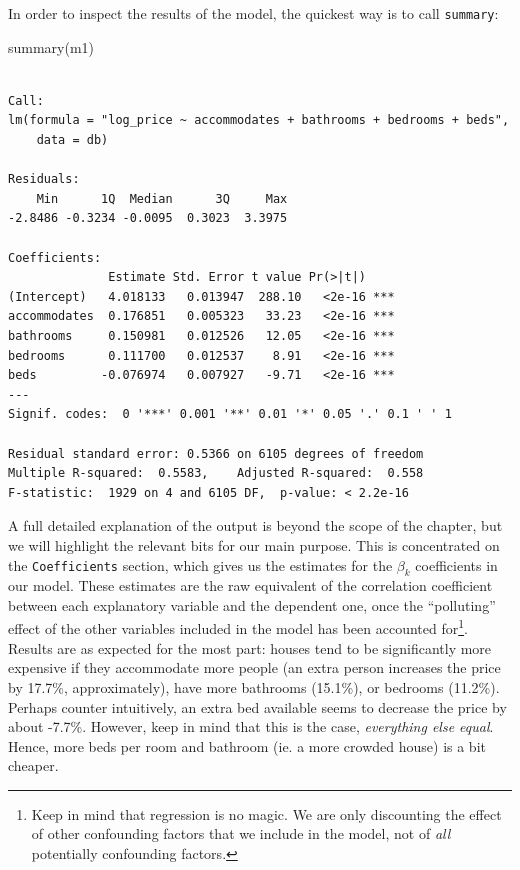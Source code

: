 \documentclass[
  letterpaper,
  DIV=11,
  numbers=noendperiod,
  oneside]{scrreprt}
\newenvironment{Shaded}{\begin{snugshade}}{\end{snugshade}}
\newcommand{\FunctionTok}[1]{\textcolor[rgb]{0.28,0.35,0.67}{#1}}
\newcommand{\NormalTok}[1]{\textcolor[rgb]{0.00,0.23,0.31}{#1}}
\begin{document}
In order to inspect the results of the model, the quickest way is to
call \texttt{summary}:

\begin{Shaded}
\begin{Highlighting}[]
\FunctionTok{summary}\NormalTok{(m1)}
\end{Highlighting}
\end{Shaded}

\begin{verbatim}

Call:
lm(formula = "log_price ~ accommodates + bathrooms + bedrooms + beds", 
    data = db)

Residuals:
    Min      1Q  Median      3Q     Max 
-2.8486 -0.3234 -0.0095  0.3023  3.3975 

Coefficients:
              Estimate Std. Error t value Pr(>|t|)    
(Intercept)   4.018133   0.013947  288.10   <2e-16 ***
accommodates  0.176851   0.005323   33.23   <2e-16 ***
bathrooms     0.150981   0.012526   12.05   <2e-16 ***
bedrooms      0.111700   0.012537    8.91   <2e-16 ***
beds         -0.076974   0.007927   -9.71   <2e-16 ***
---
Signif. codes:  0 '***' 0.001 '**' 0.01 '*' 0.05 '.' 0.1 ' ' 1

Residual standard error: 0.5366 on 6105 degrees of freedom
Multiple R-squared:  0.5583,    Adjusted R-squared:  0.558 
F-statistic:  1929 on 4 and 6105 DF,  p-value: < 2.2e-16
\end{verbatim}

A full detailed explanation of the output is beyond the scope of the
chapter, but we will highlight the relevant bits for our main purpose.
This is concentrated on the \texttt{Coefficients} section, which gives
us the estimates for the \(\beta_k\) coefficients in our model. These
estimates are the raw equivalent of the correlation coefficient between
each explanatory variable and the dependent one, once the ``polluting''
effect of the other variables included in the model has been accounted
for\footnote{Keep in mind that regression is no magic. We are only
  discounting the effect of other confounding factors that we include in
  the model, not of \emph{all} potentially confounding factors.}.
Results are as expected for the most part: houses tend to be
significantly more expensive if they accommodate more people (an extra
person increases the price by 17.7\%, approximately), have more
bathrooms (15.1\%), or bedrooms (11.2\%). Perhaps counter intuitively,
an extra bed available seems to decrease the price by about -7.7\%.
However, keep in mind that this is the case, \emph{everything else
equal}. Hence, more beds per room and bathroom (ie. a more crowded
house) is a bit cheaper.
\end{document}
